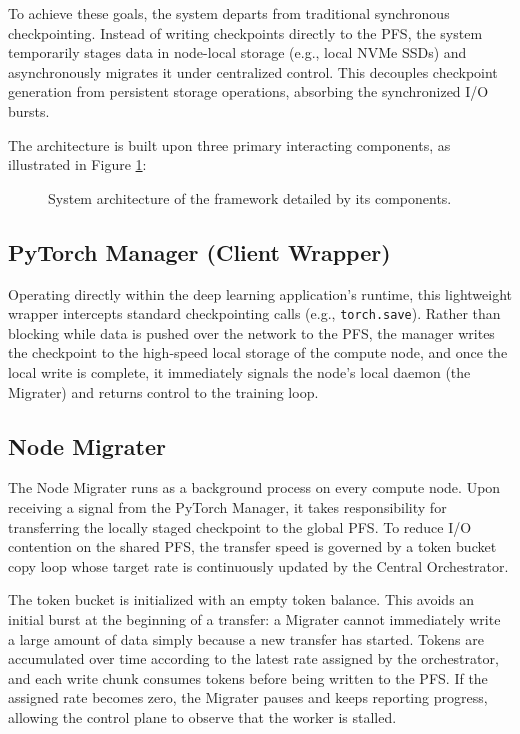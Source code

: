 \documentclass[sigplan,twocolumn,10pt,nonacm]{acmart}
\begin{document}
To achieve these goals, the system departs from traditional synchronous checkpointing. Instead of writing checkpoints directly to the PFS, the system temporarily
stages data in node-local storage (e.g., local NVMe SSDs) and asynchronously migrates it under centralized control. This decouples checkpoint generation from persistent
storage operations, absorbing the synchronized I/O bursts.

The architecture is built upon three primary interacting components, as illustrated in Figure \ref{fig:architecture}:

\begin{figure}[htbp]
    \centering
    \resizebox{\columnwidth}{!}{%
    }
    \caption{System architecture of the framework detailed by its components.}
    \label{fig:architecture}
\end{figure}

\subsection{PyTorch Manager (Client Wrapper)}

Operating directly within the deep learning application's runtime, this lightweight wrapper intercepts standard checkpointing calls (e.g., \texttt{torch.save}).
Rather than blocking while data is pushed over the network to the PFS, the manager writes the checkpoint to the high-speed local storage of the compute
node, and once the local write is complete, it immediately signals the node's local daemon (the Migrater) and returns control to the training loop.

\subsection{Node Migrater}

The Node Migrater runs as a background process on every compute node. Upon
receiving a signal from the PyTorch Manager, it takes responsibility for
transferring the locally staged checkpoint to the global PFS. To reduce I/O
contention on the shared PFS, the transfer speed is governed by a token bucket
copy loop whose target rate is continuously updated by the Central Orchestrator.

The token bucket is initialized with an empty token balance. This avoids an
initial burst at the beginning of a transfer: a Migrater cannot immediately
write a large amount of data simply because a new transfer has started. Tokens
are accumulated over time according to the latest rate assigned by the
orchestrator, and each write chunk consumes tokens before being written to the
PFS. If the assigned rate becomes zero, the Migrater pauses and keeps reporting
progress, allowing the control plane to observe that the worker is stalled.
\end{document}
